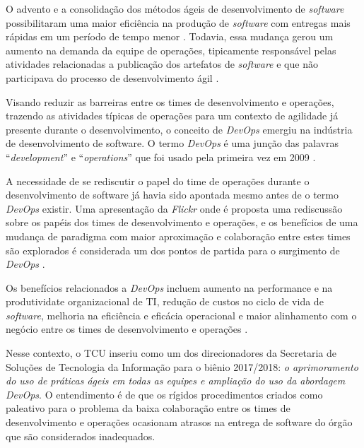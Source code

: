O advento e a consolidação dos métodos ágeis de desenvolvimento de
\textit{software} possibilitaram uma maior eficiência na produção de
\textit{software} com entregas mais rápidas em um período de tempo menor
\cite{}. Todavia, essa mudança gerou um aumento na demanda da equipe de
operações, tipicamente responsável pelas atividades relacionadas a
publicação dos artefatos de \textit{software} e que não participava
do processo de desenvolvimento ágil \cite{humble2010continuous}.

Visando reduzir as barreiras entre os times de desenvolvimento e operações,
trazendo as atividades típicas de operações para um contexto de agilidade
já presente durante o desenvolvimento, o conceito de \textit{DevOps} emergiu
na indústria de desenvolvimento de software. O termo \textit{DevOps} é uma
junção das palavras ``\textit{development}'' e ``\textit{operations}'' que
foi usado pela primeira vez em 2009 \cite{devops_for_developers}.

A necessidade de se rediscutir o papel do time de operações durante o
desenvolvimento de software já havia sido apontada mesmo antes de o termo
\textit{DevOps} existir. Uma apresentação da \textit{Flickr} \cite{flickr}
onde é proposta uma rediscussão sobre os papéis dos times de desenvolvimento e
operações, e os benefícios de uma mudança de paradigma
com maior aproximação e colaboração entre estes times são
explorados é considerada um dos pontos de partida para o surgimento de
\textit{DevOps} \cite{devops_for_developers}.

Os benefícios relacionados a \textit{DevOps} incluem aumento na performance
e na produtividate organizacional de \acrshort{TI}, redução de custos no ciclo de vida
de \textit{software}, melhoria na eficiência e eficácia operacional e maior
alinhamento com o negócio entre os times de desenvolvimento e operações
\cite{characterizing_devops}.

Nesse contexto, o \acrfull{TCU} inseriu como um dos direcionadores da Secretaria
de Soluções de Tecnologia da Informação para o biênio 2017/2018: \emph{o
aprimoramento do uso de práticas ágeis em todas as equipes e ampliação do uso da
abordagem DevOps}. O entendimento é de que os rígidos procedimentos criados
como paleativo para o problema da baixa colaboração entre os times de
desenvolvimento e operações ocasionam atrasos na entrega de software do órgão
que são considerados inadequados.

